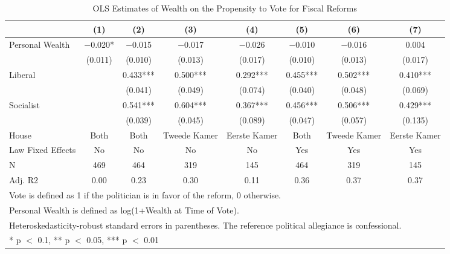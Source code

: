 \begin{table}

\caption{\label{tab:baseline_ols}OLS Estimates of Wealth on the Propensity to Vote for Fiscal Reforms}
\centering
\begin{tabular}[t]{lccccccc}
\toprule
  & (1) & (2) & (3) & (4) & (5) & (6) & (7)\\
\midrule
Personal Wealth & \num{-0.020}* & \num{-0.015} & \num{-0.017} & \num{-0.026} & \num{-0.010} & \num{-0.016} & \num{0.004}\\
 & (\num{0.011}) & (\num{0.010}) & (\num{0.013}) & (\num{0.017}) & (\num{0.010}) & (\num{0.013}) & (\num{0.017})\\
Liberal &  & \num{0.433}*** & \num{0.500}*** & \num{0.292}*** & \num{0.455}*** & \num{0.502}*** & \num{0.410}***\\
 &  & (\num{0.041}) & (\num{0.049}) & (\num{0.074}) & (\num{0.040}) & (\num{0.048}) & (\num{0.069})\\
Socialist &  & \num{0.541}*** & \num{0.604}*** & \num{0.367}*** & \num{0.456}*** & \num{0.506}*** & \num{0.429}***\\
 &  & (\num{0.039}) & (\num{0.045}) & (\num{0.089}) & (\num{0.047}) & (\num{0.057}) & (\num{0.135})\\
\midrule
House & Both & Both & Tweede Kamer & Eerste Kamer & Both & Tweede Kamer & Eerste Kamer\\
Law Fixed Effects & No & No & No & No & Yes & Yes & Yes\\
N & \num{469} & \num{464} & \num{319} & \num{145} & \num{464} & \num{319} & \num{145}\\
Adj. R2 & \num{0.00} & \num{0.23} & \num{0.30} & \num{0.11} & \num{0.36} & \num{0.37} & \num{0.37}\\
\bottomrule
\multicolumn{8}{l}{\rule{0pt}{1em}Vote is defined as 1 if the politician is in favor of the reform, 0 otherwise.}\\
\multicolumn{8}{l}{\rule{0pt}{1em}Personal Wealth is defined as log(1+Wealth at Time of Vote).}\\
\multicolumn{8}{l}{\rule{0pt}{1em}Heteroskedasticity-robust standard errors in parentheses. The reference political allegiance is confessional.}\\
\multicolumn{8}{l}{\rule{0pt}{1em}* p $<$ 0.1, ** p $<$ 0.05, *** p $<$ 0.01}\\
\end{tabular}
\end{table}
